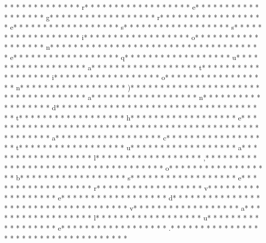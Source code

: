 *  * * *  *  * * *  *  * * *  * r* * *  * * *  * * *  *  * * *  *  * * *  * e* * *  * * *  * * *  *  * * *  *  * * *  * g* * *  * * *  * * *  *  * * *  *  * * *  * r* * *  * * *  * * *  *  * * *  *  * * *  * e* * *  * * *  * * *  *  * * *  *  * * *  * s* * *  * * *  * * *  *  * * *  *  * * *  * s* * *  * * *  * * *  *  * * *  *  * * *  * i* * *  * * *  * * *  *  * * *  *  * * *  * o* * *  * * *  * * *  *  * * *  *  * * *  * n* * *  * * *  * * *  *  * * *  *  * * *  *  * * *  * * *  * * *  *  * * *  *  * * *  * e* * *  * * *  * * *  *  * * *  *  * * *  * q* * *  * * *  * * *  *  * * *  *  * * *  * u* * *  * * *  * * *  *  * * *  *  * * *  * a* * *  * * *  * * *  *  * * *  *  * * *  * t* * *  * * *  * * *  *  * * *  *  * * *  * i* * *  * * *  * * *  *  * * *  *  * * *  * o* * *  * * *  * * *  *  * * *  *  * * *  * n* * *  * * *  * * *  *  * * *  *  * * *  * )* * *  * * *  * * *  *  * * *  *  * * *  *  * * *  * * *  * * *  *  * * *  *  * * *  * a* * *  * * *  * * *  *  * * *  *  * * *  * n* * *  * * *  * * *  *  * * *  *  * * *  * d* * *  * * *  * * *  *  * * *  *  * * *  *  * * *  * * *  * * *  *  * * *  *  * * *  * t* * *  * * *  * * *  *  * * *  *  * * *  * h* * *  * * *  * * *  *  * * *  *  * * *  * e* * *  * * *  * * *  *  * * *  *  * * *  *  * * *  * * *  * * *  *  * * *  *  * * *  * 
* * *  * * *  * * *  *  * * *  *  * * *  * a* * *  * * *  * * *  *  * * *  *  * * *  * c* * *  * * *  * * *  *  * * *  *  * * *  * t* * *  * * *  * * *  *  * * *  *  * * *  * u* * *  * * *  * * *  *  * * *  *  * * *  * a* * *  * * *  * * *  *  * * *  *  * * *  * l* * *  * * *  * * *  *  * * *  *  * * *  * ,* * *  * * *  * * *  *  * * *  *  * * *  *  * * *  * * *  * * *  *  * * *  *  * * *  * o* * *  * * *  * * *  *  * * *  *  * * *  * b* * *  * * *  * * *  *  * * *  *  * * *  * s* * *  * * *  * * *  *  * * *  *  * * *  * e* * *  * * *  * * *  *  * * *  *  * * *  * r* * *  * * *  * * *  *  * * *  *  * * *  * v* * *  * * *  * * *  *  * * *  *  * * *  * e* * *  * * *  * * *  *  * * *  *  * * *  * d* * *  * * *  * * *  *  * * *  *  * * *  *  * * *  * * *  * * *  *  * * *  *  * * *  * v* * *  * * *  * * *  *  * * *  *  * * *  * a* * *  * * *  * * *  *  * * *  *  * * *  * l* * *  * * *  * * *  *  * * *  *  * * *  * u* * *  * * *  * * *  *  * * *  *  * * *  * e* * *  * * *  * * *  *  * * *  *  * * *  * .* * *  * * *  * * *  *  * * *  *  * * *  *  * * *  * * *  * * *  *  * * *  *  * * *  * 
